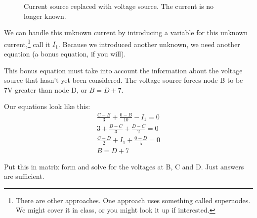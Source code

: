 \begin{figure}[H]
\begin{center}
\caption{Current source replaced with voltage source. The current is no longer known.}
\label{F:4NODV}
\end{center}
\end{figure}

We can handle this unknown current by introducing a variable for this unknown current,\footnote{There are other approaches. One approach uses something called supernodes. We might cover it in class, or you might look it up if interested.} call it $I_1$.  Because we introduced another unknown, we need another equation (a bonus equation, if you will). \par
This bonus equation must take into account the information about the voltage source that hasn't yet been considered. The voltage source forces node B to be 7V greater than node D, or $B =D+7$.\par
Our equations look like this:
\
\begin{align}
\frac{C-B}{3}+\frac{0-B}{10}-I_1=0 \tag{Node B}\\
3 + \frac{B-C}{3}+\frac{D-C}{2}=0 \tag{Node C}\\
\frac{C-D}{2}+I_1+\frac{0-D}{5}=0 \tag{Node D}\\
B=D+7 \tag{Bonus Equation due to 7V Voltage Source}
\end{align} 

\begin{clevel}
Put this in matrix form and solve for the voltages at B, C and D. Just answers are sufficient.
\end{clevel}

